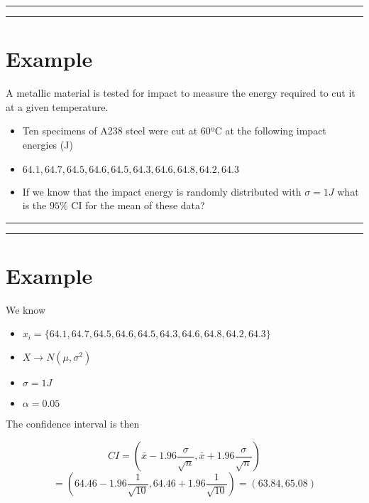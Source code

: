 \documentclass[
]{book}
\providecommand{\tightlist}{%
  \setlength{\itemsep}{0pt}\setlength{\parskip}{0pt}}
\begin{document}
\begin{center}\rule{0.5\linewidth}{0.5pt}\end{center}

\begin{center}\rule{0.5\linewidth}{0.5pt}\end{center}

\hypertarget{example-17}{%
\section{Example}\label{example-17}}

A metallic material is tested for impact to measure the energy required to cut it at a given temperature.

\begin{itemize}
\item
  Ten specimens of A238 steel were cut at 60ºC at the following impact energies (J)
\item
  \(64.1, 64.7, 64.5, 64.6, 64.5, 64.3, 64.6, 64.8, 64.2, 64.3\)
\item
  If we know that the impact energy is randomly distributed with \(\sigma=1J\) what is the \(95\%\) CI for the mean of these data?
\end{itemize}

\begin{center}\rule{0.5\linewidth}{0.5pt}\end{center}

\begin{center}\rule{0.5\linewidth}{0.5pt}\end{center}

\hypertarget{example-18}{%
\section{Example}\label{example-18}}

We know

\begin{itemize}
\tightlist
\item
  \(x_i=\{64.1, 64.7, 64.5, 64.6, 64.5, 64.3, 64.6, 64.8, 64.2, 64.3\}\)
\item
  \(X \rightarrow N(\mu, \sigma^2)\)
\item
  \(\sigma=1J\)
\item
  \(\alpha=0.05\)
\end{itemize}

The confidence interval is then

\[CI=(\bar{x}-1.96 \frac{\sigma}{\sqrt{n}}, \bar{x}+1.96  \frac{\sigma}{\sqrt{n}})\]
\[=(64.46-1.96 \frac{1}{\sqrt{10}}, 64.46+1.96  \frac{1}{\sqrt{10}})=(63.84,65.08)\]
\end{document}
